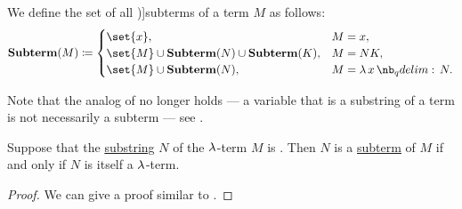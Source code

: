 \begin{definition}\label{def:lambda_subterm}
  We define the set of all \term[ru=подтерм (\cite[189]{Герасимов2011})]{subterms} of a term \( M \) as follows:
  \begin{equation*}
    \boldop{Subterm}(M) \coloneqq \begin{cases}
      \set{ x },                                                 &M = x, \\
      \set{M} \cup \boldop{Subterm}(N) \cup \boldop{Subterm}(K), &M = N K, \\
      \set{M} \cup \boldop{Subterm}(N),                          &M = \qabs x N.
    \end{cases}
  \end{equation*}
\end{definition}
\begin{comments}
  \item Note that the analog of  no longer holds --- a variable that is a substring of a term is not necessarily a subterm --- see .
\end{comments}

\begin{proposition}\label{thm:lambda_subterm_characterization}
  Suppose that the \hyperref[def:formal_language/subword]{substring} \( N \) of the \( \mathrm{\lambda} \)-term \( M \) is . Then \( N \) is a \hyperref[def:lambda_subterm]{subterm} of \( M \) if and only if \( N \) is itself a \( \mathrm{\lambda} \)-term.
\end{proposition}
\begin{proof}
  We can give a proof similar to .
\end{proof}

